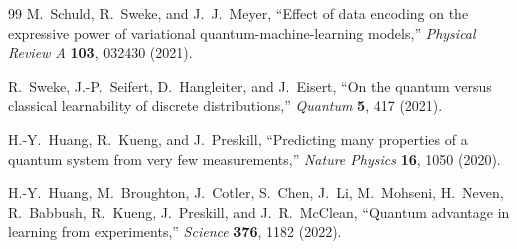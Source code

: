 \documentclass[11pt,a4paper]{article}
\begin{document}
\begin{thebibliography}{99}
 M.~Schuld, R.~Sweke, and J.~J.~Meyer, ``Effect of data
encoding on the expressive power of variational quantum-machine-learning
models,'' \emph{Physical Review A} \textbf{103}, 032430 (2021).

 R.~Sweke, J.-P.~Seifert, D.~Hangleiter, and J.~Eisert, ``On
the quantum versus classical learnability of discrete distributions,''
\emph{Quantum} \textbf{5}, 417 (2021).

 H.-Y.~Huang, R.~Kueng, and J.~Preskill, ``Predicting many
properties of a quantum system from very few measurements,'' \emph{Nature
Physics} \textbf{16}, 1050 (2020).

 H.-Y.~Huang, M.~Broughton, J.~Cotler, S.~Chen, J.~Li,
M.~Mohseni, H.~Neven, R.~Babbush, R.~Kueng, J.~Preskill, and J.~R.~McClean,
``Quantum advantage in learning from experiments,'' \emph{Science} \textbf{376},
1182 (2022).

\end{thebibliography}
\end{document}
